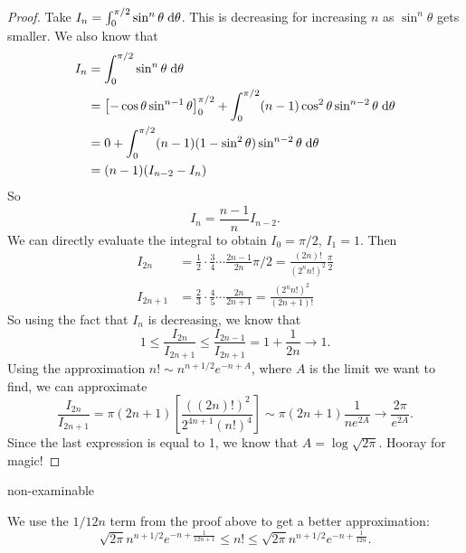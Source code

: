 \begin{note}
\begin{field}
\begin{proof}
      Take $I_n = \int_0^{\pi/2} \sin^n\theta\;\mathrm{d} \theta$. This is decreasing for increasing $n$ as $\sin^n\theta$ gets smaller. We also know that
      \begin{align*}
        I_n &= \int_0^{\pi/2}\sin^n \theta\;\mathrm{d} \theta\\
        &= \left[-\cos\theta\sin^{n - 1}\theta \right]_0^{\pi/2} + \int_0^{\pi/2} (n - 1)\cos^2\theta \sin^{n - 2}\theta \;\mathrm{d}\theta\\
        &= 0 + \int_0^{\pi/2}(n - 1)(1 - \sin^2 \theta)\sin^{n - 2}\theta \;\mathrm{d} \theta\\
        &= (n - 1)(I_{n - 2} - I_n)
      \end{align*}
      So
      \[
        I_n = \frac{n - 1}{n}I_{n - 2}.
      \]
      We can directly evaluate the integral to obtain $I_0 = \pi/2$, $I_1 = 1$. Then
      \begin{align*}
        I_{2n} &= \frac{1}{2}\cdot\frac{3}{4}\cdots \frac{2n - 1}{2n} \pi/2 = \frac{(2n)!}{(2^nn!)^2}\frac{\pi}{2}\\
        I_{2n + 1} &= \frac{2}{3}\cdot\frac{4}{5}\cdots\frac{2n}{2n + 1} = \frac{(2^nn!)^2}{(2n + 1)!}
      \end{align*}
      So using the fact that $I_n$ is decreasing, we know that
      \[
        1 \leq \frac{I_{2n}}{I_{2n + 1}} \leq \frac{I_{2n - 1}}{I_{2n + 1}} = 1 + \frac{1}{2n} \to 1.
      \]
      Using the approximation $n!\sim n^{n + 1/2}e^{-n + A}$, where $A$ is the limit we want to find, we can approximate
      \[
        \frac{I_{2n}}{I_{2n + 1}} = \pi(2n + 1)\left[\frac{( (2n)!)^2}{2^{4n + 1}(n!)^4}\right] \sim \pi(2n + 1)\frac{1}{ne^{2A}}\to \frac{2\pi}{e^{2A}}.
      \]
      Since the last expression is equal to 1, we know that $A = \log\sqrt{2\pi}$. Hooray for magic!
    \end{proof}
  \end{field}
  \xplain{}%
\end{note}

%
\begin{note}
  \begin{field}
    non-examinable
  \end{field}
  \begin{field}
    \begin{prop}
      We use the $1/12n$ term from the proof above to get a better approximation:
      \[
        \sqrt{2\pi}n^{n + 1/2}e^{-n + \frac{1}{12n + 1}} \leq n! \leq \sqrt{2\pi} n^{n + 1/2} e^{-n + \frac{1}{12n}}.
      \]
    \end{prop}
  \end{field}
  \xplain{}%
\end{note}

